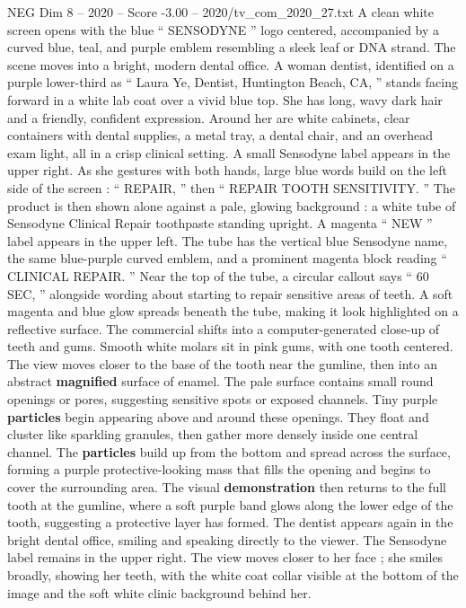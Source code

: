 \begin{textsample}{NEG Dim 8 – 2020 – Score -3.00 – 2020/tv\_com\_2020\_27.txt}  \label{ex:f8_neg_048}
A clean white screen opens with the blue “ SENSODYNE ” logo centered, accompanied by a curved blue, teal, and purple emblem resembling a sleek leaf or DNA strand.
The scene moves into a bright, modern dental office.
A woman dentist, identified on a purple lower-third as “ Laura Ye, Dentist, Huntington Beach, CA, ” stands facing forward in a white lab coat over a vivid blue top.
She has long, wavy dark hair and a friendly, confident expression.
Around her are white cabinets, clear containers with dental supplies, a metal tray, a dental chair, and an overhead exam light, all in a crisp clinical setting.
A small Sensodyne label appears in the upper right.
As she gestures with both hands, large blue words build on the left side of the screen : “ REPAIR, ” then “ REPAIR TOOTH SENSITIVITY. ” The product is then shown alone against a pale, glowing background : a white tube of Sensodyne Clinical Repair toothpaste standing upright.
A magenta “ NEW ” label appears in the upper left.
The tube has the vertical blue Sensodyne name, the same blue-purple curved emblem, and a prominent magenta block reading “ CLINICAL REPAIR. ” Near the top of the tube, a circular callout says “ 60 SEC, ” alongside wording about starting to repair sensitive areas of teeth.
A soft magenta and blue glow spreads beneath the tube, making it look highlighted on a reflective surface.
The commercial shifts into a computer-generated close-up of teeth and gums.
Smooth white molars sit in pink gums, with one tooth centered.
The view moves closer to the base of the tooth near the gumline, then into an abstract \textbf{magnified} surface of enamel.
The pale surface contains small round openings or pores, suggesting sensitive spots or exposed channels.
Tiny purple \textbf{particles} begin appearing above and around these openings.
They float and cluster like sparkling granules, then gather more densely inside one central channel.
The \textbf{particles} build up from the bottom and spread across the surface, forming a purple protective-looking mass that fills the opening and begins to cover the surrounding area.
The visual \textbf{demonstration} then returns to the full tooth at the gumline, where a soft purple band glows along the lower edge of the tooth, suggesting a protective layer has formed.
The dentist appears again in the bright dental office, smiling and speaking directly to the viewer.
The Sensodyne label remains in the upper right.
The view moves closer to her face ; she smiles broadly, showing her teeth, with the white coat collar visible at the bottom of the image and the soft white clinic background behind her.

\end{textsample}
